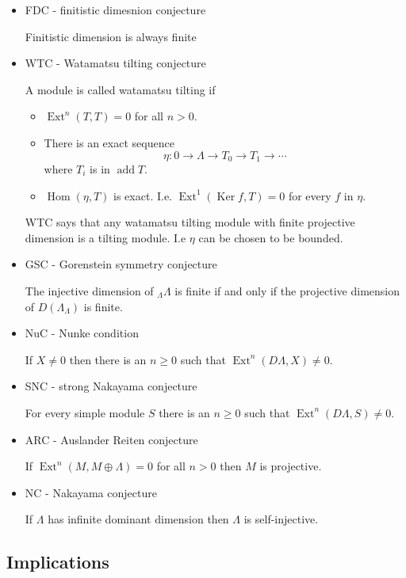 \documentclass[11pt, a4paper, english]{article}
\theoremstyle{definition}
\DeclareMathOperator{\Hom}{Hom}
\DeclareMathOperator{\Ext}{Ext}
\DeclareMathOperator{\Ker}{Ker}
\DeclareMathOperator{\add}{add}
\begin{document}
\begin{itemize}
	\item FDC - finitistic dimesnion conjecture
	
	Finitistic dimension is always finite
	
	\item WTC - Watamatsu tilting conjecture
	
	A module is called watamatsu tilting if
	\begin{itemize}
		\item $\Ext^n(T,T)=0$ for all $n >0$.
		\item There is an exact sequence $$\eta: 0 \to \Lambda \to T_0 \to T_1 \to \cdots$$ where $T_i$ is in $\add T$.
		\item $\Hom(\eta, T)$ is exact. I.e. $\Ext^1(\Ker f, T)=0$ for every $f$ in $\eta$.
	\end{itemize}
	WTC says that any watamatsu tilting module with finite projective dimension is a tilting module. I.e $\eta$ can be chosen to be bounded.
	
	\item GSC - Gorenstein symmetry conjecture
	
	The injective dimension of $_\Lambda\Lambda$ is finite if and only if the projective dimension of $D(\Lambda_\Lambda)$ is finite.
	
	\item NuC - Nunke condition
	
	If $X \neq 0$ then there is an $n \geq 0$ such that $\Ext^n(D\Lambda, X) \neq 0$. 
	
	\item SNC - strong Nakayama conjecture
	
	For every simple module $S$ there is an $n \geq 0$ such that $\Ext^n(D\Lambda, S) \neq 0$. 
	
	\item ARC - Auslander Reiten conjecture
	
	If $\Ext^n(M, M \oplus \Lambda) = 0$ for all $n > 0$ then $M$ is projective. 
	
	\item NC - Nakayama conjecture
	
	If $\Lambda$ has infinite dominant dimension then $\Lambda$ is self-injective.
	
\end{itemize}

\subsection{Implications}
\end{document}
